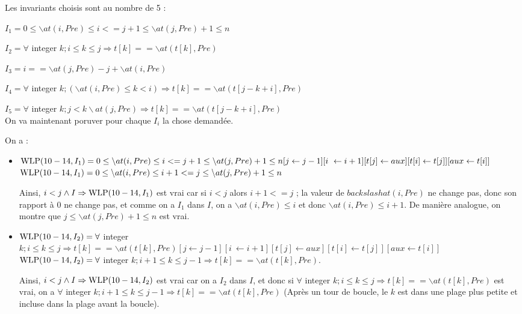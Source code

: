 \documentclass[11pt,answers]{exam}
\begin{document}
\begin{questions}
\begin{parts}
    \begin{solutionorbox}
        Les invariants choisis sont au nombre de 5 :

        $I_1 =  0 \leq \backslash at(i, Pre) \leq i<=j+1 \leq \backslash at(j, Pre)+1 \leq n$

        $I_2 = \forall$ integer $k; i \leq k \leq j \Rightarrow t[k] == \backslash at(t[k], Pre)$

        $I_3 = i == \backslash at(j, Pre) -j  + \backslash at(i, Pre)$

        $I_4 = \forall$ integer $k; (\backslash at(i, Pre) \leq k<i) \Rightarrow t[k] == \backslash at(t[j- k + i], Pre)$

        $I_5 = \forall$ integer $k; j<k\backslash at(j, Pre) \Rightarrow t[k] == \backslash at(t[j- k + i], Pre)$ \\

        On va maintenant poruver pour chaque $I_i$ la chose demandée.

        On a : 

        \begin{itemize}
            \item $\mathrm{WLP}(10-14,I_1) = 0 \leq \backslash at(i, Pre) \leq i<=j+1 \leq \backslash at(j, Pre)+1 \leq n [j \leftarrow j-1][i \ \leftarrow i+1][t[j] \leftarrow aux][t[i] \leftarrow t[j]][aux \leftarrow t[i]]$
                  $\mathrm{WLP}(10-14,I_1) =  0 \leq \backslash at(i, Pre) \leq i+1<=j \leq \backslash at(j, Pre)+1 \leq n $

                  Ainsi,  $i < j \land I \Rightarrow \mathrm{WLP}(10-14,I_1)$ est vrai car si $i < j$ alors $i+1<=j$ ; la valeur de $backslash at(i, Pre)$ ne change pas, donc son rapport à 0 ne change pas, et comme on a $I_1$ dans $I$, on a $\backslash at(i, Pre) \leq i$ et donc $\backslash at(i, Pre) \leq i+1$. De manière analogue, on montre que $j \leq \backslash at(j, Pre)+1 \leq n $ est vrai.
            \item $\mathrm{WLP}(10-14,I_2) =\forall$ integer $k; i \leq k \leq j \Rightarrow t[k] == \backslash at(t[k], Pre)[j \leftarrow j-1][i \ \leftarrow i+1][t[j] \leftarrow aux][t[i] \leftarrow t[j]][aux \leftarrow t[i]]$
                  $\mathrm{WLP}(10-14,I_2) =\forall$ integer $k; i+1 \leq k \leq j-1 \Rightarrow t[k] == \backslash at(t[k], Pre)$.

                  Ainsi,  $i < j \land I \Rightarrow \mathrm{WLP}(10-14,I_2)$ est vrai car on a $I_2$ dans $I$, et donc si $\forall$ integer $k; i \leq k \leq j \Rightarrow t[k] == \backslash at(t[k], Pre)$ est vrai, on a $\forall$ integer $k; i+1 \leq k \leq j-1 \Rightarrow t[k] == \backslash at(t[k], Pre)$ (Après un tour de boucle, le $k$ est dans une plage plus petite et incluse dans la plage avant la boucle).


\end{itemize}
\end{solutionorbox}
\end{parts}
\end{questions}
\end{document}
